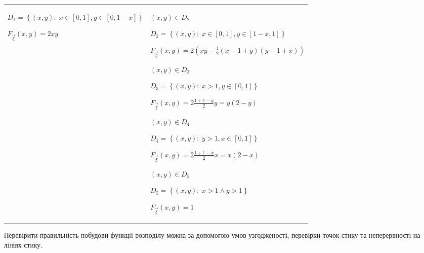 \begin{example}
\begin{enumerate}
\begin{tabular}{p{6cm} p{6cm}}
            $D_1 = \left\{(x, y):\; x \in \left[0, 1\right],
            y \in \left[0, 1-x\right]\right\}$

            $F_{\vec{\xi}}(x, y) = 2xy$&
            $(x, y) \in D_2$
            
            $D_2 = \left\{(x, y):\; x \in \left[0, 1\right],
            y \in \left[1-x, 1\right]\right\}$

            $F_{\vec{\xi}}(x, y) = 2(xy - \frac{1}{2}(x-1+y)(y-1+x))$

            \vspace{5mm}

            $(x, y) \in D_3$
            
            $D_3 = \left\{(x, y):\; x > 1,
            y \in \left[0, 1\right]\right\}$

            $F_{\vec{\xi}}(x, y) = 2\frac{1+1-y}{2}y = y(2-y)$
            
            \vspace{5mm}

            $(x, y) \in D_4$
            
            $D_4 = \left\{(x, y):\; y > 1,
            x \in \left[0, 1\right]\right\}$

            $F_{\vec{\xi}}(x, y) = 2\frac{1+1-x}{2}x = x(2-x)$
            
            \vspace{5mm}
            
            $(x, y) \in D_5$
            
            $D_5 = \left\{(x, y):\; x > 1 \land y > 1\right\}$

            $F_{\vec{\xi}}(x, y) = 1$\\
           
        \end{tabular}
    \end{enumerate}
\end{example}

\begin{remark}
    Перевірити правильність побудови функції розподілу можна за допомогою 
    умов узгодженості, перевірки точок стику та неперервності на лініях стику.
\end{remark}

